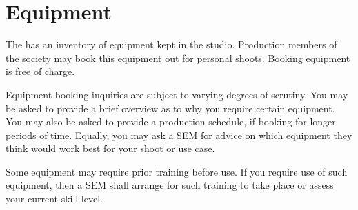 \documentclass[]{article}
\begin{document}
\section{Equipment}\label{equipment}
The has an inventory of equipment kept in the studio. Production members of the society may book this equipment out for personal shoots. Booking equipment is free of charge.

Equipment booking inquiries are subject to varying degrees of scrutiny. You may be asked to provide a brief overview as to why you require certain equipment. You may also be asked to provide a production schedule, if booking for longer periods of time. Equally, you may ask a SEM for advice on which equipment they think would work best for your shoot or use case.

Some equipment may require prior training before use. If you require use of such equipment, then a SEM shall arrange for such training to take place or assess your current skill level.
\end{document}
